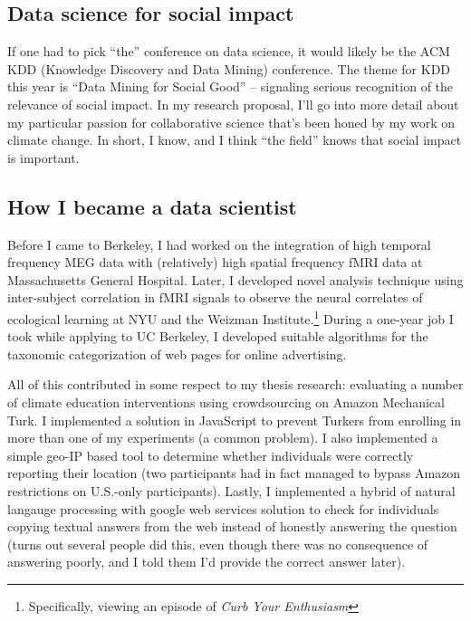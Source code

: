 \subsection*{Data science for social impact}

If one had to pick “the” conference on data science, it would likely be the ACM KDD
(Knowledge Discovery and Data Mining) conference. The theme for KDD this year is
“Data Mining for Social Good” -- signaling serious recognition of the relevance
of social impact. In my research proposal, I'll go into more detail about my
particular passion for collaborative science that's been honed by my work on
climate change. In short, I know, and I think “the field” knows that social
impact is important.

\subsection*{How I became a data scientist}


Before I came to Berkeley, I had worked on the integration of high temporal
frequency MEG data with (relatively) high spatial frequency fMRI data at
Massachusetts General Hospital. Later, I developed novel analysis technique
using inter-subject correlation in fMRI signals to observe the neural correlates
of ecological learning at NYU and the Weizman Institute.\footnote{Specifically,
    viewing an episode of \emph{Curb Your Enthusiasm}} During a one-year job I
took while applying to UC Berkeley, I developed suitable algorithms for the
taxonomic categorization of web pages for online advertising.

All of this contributed in some respect to my thesis research: evaluating a
number of climate education interventions using crowdsourcing on Amazon
Mechanical Turk. I implemented a solution in JavaScript to prevent Turkers from
enrolling in more than one of my experiments (a common problem). %
I also implemented a simple geo-IP based tool to determine whether individuals
were correctly reporting their location (two participants had in fact managed to
bypass Amazon restrictions on U.S.-only participants). Lastly, I implemented a
hybrid of natural langauge processing with google web services solution to
check for individuals copying textual answers from the web instead of honestly
answering the question (turns out several people did this, even though there was
no consequence of answering poorly, and I told them I'd provide the correct
answer later).

